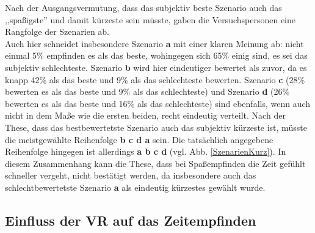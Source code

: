 \documentclass{Paper}
\begin{document}
Nach der Ausgangsvermutung, dass das subjektiv beste Szenario auch das ,,spaßigste'' und damit kürzeste sein müsste, gaben die Versuchspersonen eine Rangfolge der Szenarien ab.\\
Auch hier schneidet insbesondere Szenario \textbf{a} mit einer klaren Meinung ab: nicht einmal 5\% empfinden es als das beste, wohingegen sich 65\% einig sind, es sei das subjektiv schlechteste. Szenario \textbf{b} wird hier eindeutiger bewertet als zuvor, da es knapp 42\% als das beste und 9\% als das schlechteste bewerten. Szenario \textbf{c} (28\% bewerten es als das beste und 9\% als das schlechteste) und Szenario \textbf{d} (26\% bewerten es als das beste und 16\% als das schlechteste) sind ebenfalls, wenn auch nicht in dem Maße wie die ersten beiden, recht eindeutig verteilt. 
Nach der These, dass das bestbewertetste Szenario auch das subjektiv kürzeste ist, müsste die meistgewählte Reihenfolge \textbf{b c d a} sein. 
Die tatsächlich angegebene Reihenfolge hingegen ist allerdings \textbf{a b c d} (vgl. Abb. \ref{SzenarienKurz}).
In diesem Zusammenhang kann die These, dass bei Spaßempfinden die Zeit gefühlt schneller vergeht, nicht bestätigt werden, da insbesondere auch das schlechtbewertetste Szenario \textbf{a} als eindeutig kürzestes gewählt wurde. 

\subsection{Einfluss der VR auf das Zeitempfinden}
\end{document}
